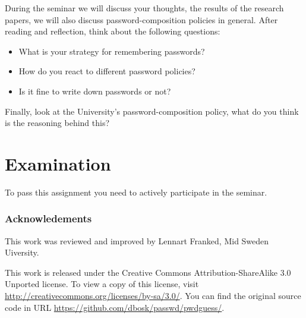 During the seminar we will discuss your thoughts, the results of the research 
papers, we will also discuss password-composition policies in general.
After reading and reflection, think about the following questions:
\begin{itemize}
  \item What is your strategy for remembering passwords?
  \item How do you react to different password policies?
  \item Is it fine to write down passwords or not?
\end{itemize}

Finally, look at the University's password-composition policy, what do you 
think is the reasoning behind this?


\section{Examination}
\label{sec:exam}
To pass this assignment you need to actively participate in the seminar.


\subsubsection*{Acknowledements}

This work was reviewed and improved by Lennart Franked, Mid Sweden Uiversity.

This work is released under the Creative Commons Attribution-ShareAlike 3.0 
Unported license.
To view a copy of this license, visit 
\url{http://creativecommons.org/licenses/by-sa/3.0/}.
You can find the original source code in URL 
\url{https://github.com/dbosk/passwd/pwdguess/}.


\printbibliography
